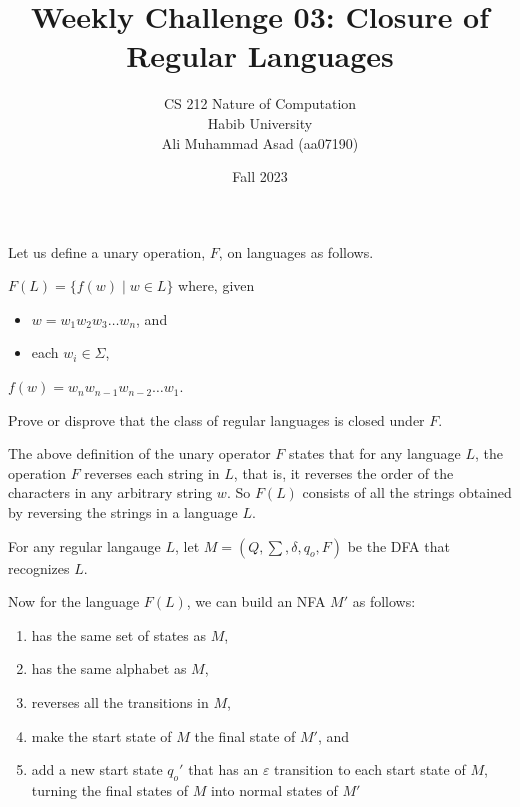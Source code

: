 \documentclass[a4paper]{exam}
\title{Weekly Challenge 03: Closure of Regular Languages}
\author{CS 212 Nature of Computation\\Habib University \\ Ali Muhammad Asad (aa07190)}
\date{Fall 2023}
\begin{document}
\maketitle

\begin{questions}
  

Let us define a unary operation, $F$, on languages as follows.

\begin{mdframed}
  $F(L) = \{ f(w) \mid w\in L\}$ where, given
  \begin{itemize}
  \item $w=w_1w_2w_3\ldots w_n$, and
  \item each $w_i\in\Sigma$,
  \end{itemize}
  $f(w) = w_nw_{n-1}w_{n-2}\ldots w_1$.
\end{mdframed}

Prove or disprove that the class of regular languages is closed under $F$.

\begin{solution}
The above definition of the unary operator $F$ states that for any language $L$, the operation $F$ reverses each string in $L$, that is, it reverses the order of the characters in any arbitrary string $w$. 
So $F(L)$ consists of all the strings obtained by reversing the strings in a language $L$.  

For any regular langauge $L$, let $M = (Q, \sum, \delta, q_o, F)$ be the DFA that recognizes $L$.

Now for the language $F(L)$, we can build an NFA $M'$ as follows: \vspace*{-3mm}
\begin{enumerate}
  \item has the same set of states as $M$, \vspace*{-2mm}
  \item has the same alphabet as $M$, \vspace*{-2mm}
  \item reverses all the transitions in $M$, \vspace*{-2mm}
  \item make the start state of $M$ the final state of $M'$, and \vspace*{-2mm}
  \item add a new start state $ q_o' $ that has an $\varepsilon$ transition to each start state of $M$, turning the final states of $M$ into normal states of $M'$
\end{enumerate}


\end{solution}
\end{questions}
\end{document}
